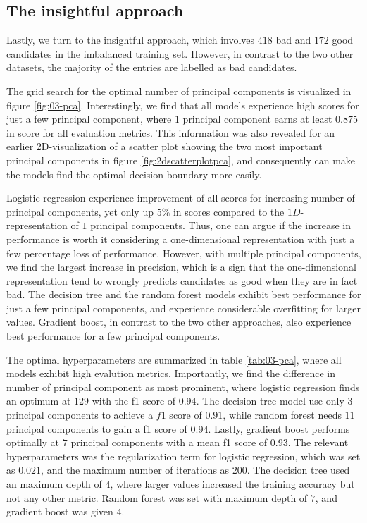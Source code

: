 \subsection{The insightful approach}

Lastly, we turn to the insightful approach, which involves $418$ bad and $172$ good candidates in the imbalanced training set. However, in contrast to the two other datasets, the majority of the entries are labelled as bad candidates.

The grid search for the optimal number of principal components is visualized in figure \ref{fig:03-pca}. Interestingly, we find that all models experience high scores for just a few principal component, where $1$ principal component earns at least $0.875$ in score for all evaluation metrics. This information was also revealed for an earlier 2D-visualization of a scatter plot showing the two most important principal components in figure \ref{fig:2dscatterplotpca}, and consequently can make the models find the optimal decision boundary more easily.

Logistic regression experience improvement of all scores for increasing number of principal components, yet only up $5\%$ in scores compared to the $1D$-representation of $1$ principal components. Thus, one can argue if the increase in performance is worth it considering a one-dimensional representation with just a few percentage loss of performance. However, with multiple principal components, we find the largest increase in precision, which is a sign that the one-dimensional representation tend to wrongly predicts candidates as good when they are in fact bad. The decision tree and the random forest models exhibit best performance for just a few principal components, and experience considerable overfitting for larger values. Gradient boost, in contrast to the two other approaches, also experience best performance for a few principal components.

The optimal hyperparameters are summarized in table \ref{tab:03-pca}, where all models exhibit high evalution metrics. Importantly, we find the difference in number of principal component as most prominent, where logistic regression finds an optimum at $129$ with the f1 score of $0.94$. The decision tree model use only $3$ principal components to achieve a $f1$ score of $0.91$, while random forest needs $11$ principal components to gain a f1 score of $0.94$. Lastly, gradient boost performs optimally at $7$ principal components with a mean f1 score of $0.93$. The relevant hyperparameters was the regularization term for logistic regression, which was set as $0.021$, and the maximum number of iterations as $200$. The decision tree used an maximum depth of $4$, where larger values increased the training accuracy but not any other metric. Random forest was set with maximum depth of $7$, and gradient boost was given $4$.

